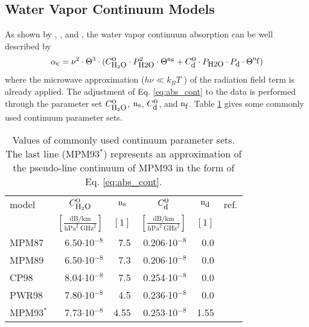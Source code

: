 \subsection{Water Vapor Continuum Models}
\label{leveld:h2o_Cont}
As shown by \citet{liebeandlayton:87}, \citet{pwr:98}, and \citet{ma:90},
the water vapor continuum absorption can be well described by 
\begin{equation} 
  \label{eq:abs_cont}
  \alpha_{\mbox{\small c}} = \nu^2 \cdot \Theta^{3} \cdot 
            (C^{\mbox{\rm o}}_{\mbox{\rm \small H}_{2}\mbox{\rm \small O}} \cdot P_{\mbox{\rm \small H2O}}^2 \cdot \Theta^{{\rm n}_{\mbox{\rm \small s}}} + 
             C^{\mbox{\rm o}}_{\mbox{\rm \small d}} \cdot P_{\mbox{\rm \small H2O}} \cdot P_{\mbox{\rm \small d}} \cdot \Theta^{{\rm n}_{\mbox{\rm \small f}}})
\end{equation}
where the microwave approximation ($h\nu\ll k_BT$ ) of the radiation field term 
is already applied. The adjustment of Eq. \ref{eq:abs_cont} to the data 
is performed through the parameter set $C^{\mbox{\rm o}}_{\mbox{\rm \small H}_{2}\mbox{\rm \small O}}$, ${\rm n}_{\mbox{\rm \small s}}$, $C^{\mbox{\rm o}}_{\mbox{\rm \small d}}$, and ${\rm n}_{\mbox{\rm \small f}}$. 
Table \ref{tab:wvcontparam} gives some commonly used continuum parameter sets.
\begin{table}[!hbt]
  \begin{center}
  \begin{tabular}{lrrrrr}
    \hline
    model  & \multicolumn{1}{c}{$C^{\mbox{\rm o}}_{\mbox{\rm \small H}_{2}\mbox{\rm \small O}}$} & 
             \multicolumn{1}{c}{${\rm n}_{\mbox{\rm \small s}}$}  & 
             \multicolumn{1}{c}{$C^{\mbox{\rm o}}_{\mbox{\rm \small d}}$} & 
             \multicolumn{1}{c}{${\rm n}_{\mbox{\rm \small d}}$}  & 
             ref.\\
           & \multicolumn{1}{c}{$\left[\frac{\mbox{dB/km}}
                               {\mbox{hPa}^2~\mbox{GHz}^2}\right]$} & 
             \multicolumn{1}{c}{$[1]$} & 
             \multicolumn{1}{c}{$\left[\frac{\mbox{dB/km}}
                               {\mbox{hPa}^2~\mbox{GHz}^2}\right]$} & 
             \multicolumn{1}{c}{$[1]$} & \\
    \hline
    MPM87  & 6.50$\cdot$10$^{-8}$ & 7.5 & 0.206$\cdot$10$^{-8}$  &  0.0 & \citet{liebeandlayton:87}\\
    MPM89  & 6.50$\cdot$10$^{-8}$ & 7.3 & 0.206$\cdot$10$^{-8}$  &  0.0 & \citet{liebe:89}\\
    CP98   & 8.04$\cdot$10$^{-8}$ & 7.5 & 0.254$\cdot$10$^{-8}$  &  0.0 & \citet{cruzpol:98}\\ 
    PWR98  & 7.80$\cdot$10$^{-8}$ & 4.5 & 0.236$\cdot$10$^{-8}$  &  0.0 & \citet{pwr:98}\\
    \hline
    MPM93$^*$ & 7.73$\cdot$10$^{-8}$ & 4.55 & 0.253$\cdot$10$^{-8}$  & 1.55 & \citet{liebeetal:93}\\
    \hline
 \end{tabular}
\end{center}
 \caption[Liebe-type continuum model parameters.]{Values of commonly used continuum parameter sets. The last line (MPM93$^*$)
   represents an approximation of the pseudo-line continuum of MPM93
   in the form of Eq. \ref{eq:abs_cont}.}
 \label{tab:wvcontparam}
\end{table}

